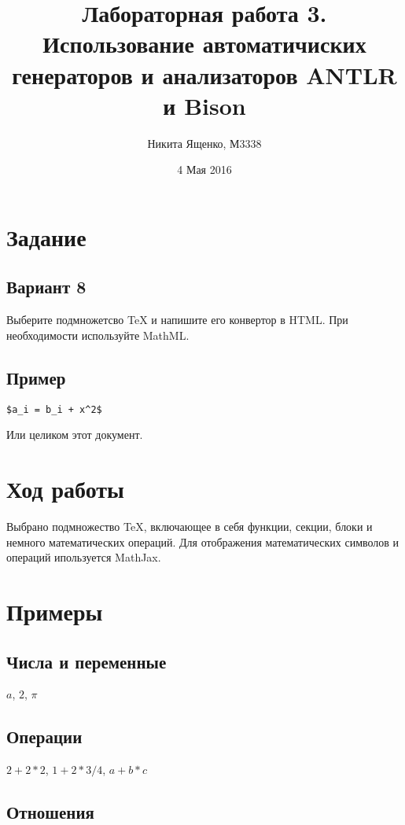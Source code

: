 \documentclass[11pt,oneside,a4paper]{article}
\title{Лабораторная работа 3. Использование автоматичиских генераторов и анализаторов ANTLR и Bison}
\author{Никита Ященко, М3338}
\date{4 Мая 2016}
\begin{document}
\maketitle

\section{Задание}
\subsection{Вариант 8}
 
Выберите подмножетсво TeX и напишите его конвертор в HTML.
При необходимости используйте MathML.

\subsection{Пример}

\begin{verbatim}
$a_i = b_i + x^2$
\end{verbatim}

Или целиком этот документ.

\section{Ход работы}

Выбрано подмножество TeX, включающее в себя функции, секции, блоки и немного математических операций.
Для отображения математических символов и операций ипользуется MathJax.

\section{Примеры}

\subsection{Числа и переменные}

$a$, $2$, $\pi$

\subsection{Операции}

$2 + 2 * 2$, $1 + 2 * 3 / 4$, $a + b * c$
 
\subsection{Отношения}
\end{document}
